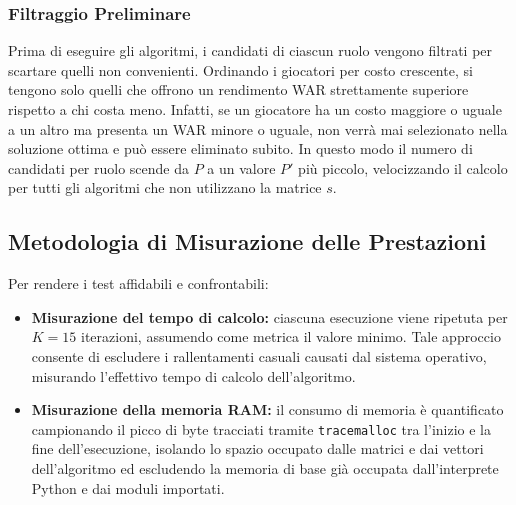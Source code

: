 \subsubsection{Filtraggio Preliminare}
Prima di eseguire gli algoritmi, i candidati di ciascun ruolo vengono filtrati per scartare quelli non convenienti. Ordinando i giocatori per costo crescente, si tengono solo quelli che offrono un rendimento WAR strettamente superiore rispetto a chi costa meno. Infatti, se un giocatore ha un costo maggiore o uguale a un altro ma presenta un WAR minore o uguale, non verrà mai selezionato nella soluzione ottima e può essere eliminato subito. In questo modo il numero di candidati per ruolo scende da $P$ a un valore $P'$ più piccolo, velocizzando il calcolo per tutti gli algoritmi che non utilizzano la matrice $s$.

\subsection{Metodologia di Misurazione delle Prestazioni}
Per rendere i test affidabili e confrontabili:
\begin{itemize}
	\item \textbf{Misurazione del tempo di calcolo:} ciascuna esecuzione viene ripetuta per $K = 15$ iterazioni, assumendo come metrica il valore minimo. Tale approccio consente di escludere i rallentamenti casuali causati dal sistema operativo, misurando l'effettivo tempo di calcolo dell'algoritmo.
	\item \textbf{Misurazione della memoria RAM:} il consumo di memoria è quantificato campionando il picco di byte tracciati tramite \texttt{tracemalloc} tra l'inizio e la fine dell'esecuzione, isolando lo spazio occupato dalle matrici e dai vettori dell'algoritmo ed escludendo la memoria di base già occupata dall'interprete Python e dai moduli importati.
\end{itemize}

\newpage
